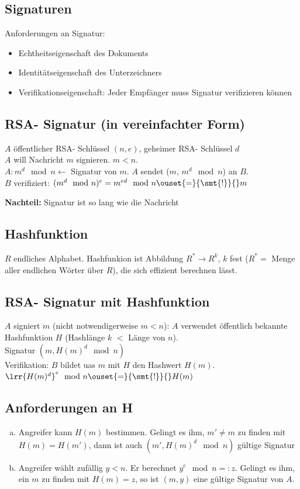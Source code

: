   \subsection{Signaturen}
    Anforderungen an Signatur:
    \begin{itemize}[-]
      \item Echtheitseigenschaft des Dokuments
      \item Identitätseigenschaft des Unterzeichners
      \item Verifikationseigenschaft: Jeder Empfänger muss Signatur
        verifizieren können
    \end{itemize}

  \subsection{RSA- Signatur (in vereinfachter Form)}
    $A$ öffentlicher RSA- Schlüssel $(n,e)$, geheimer RSA- Schlüssel $d$\\
    $A$ will Nachricht $m$ signieren. $m<n$.\\
    $A: m^d\mod n\longleftarrow$ Signatur von $m$. $A$ sendet ($m$, $m^d\mod
    n$) an $B$.\\
    $B$ verifiziert: $(m^d\mod n)^e=m^{ed}\mod n\ouset{=}{\smt{!}}{}m$

    \textbf{Nachteil:} Signatur ist so lang wie die Nachricht

  \subsection{Hashfunktion}
    $R$ endliches Alphabet. Hashfunkion ist Abbildung $R^*\rightarrow R^k$, $k$
    fest ($R^*=$ Menge aller endlichen Wörter über $R$), die sich effizient
    berechnen lässt.

  \subsection{RSA- Signatur mit Hashfunktion}
    $A$ signiert $m$ (nicht notwendigerweise $m<n$): $A$ verwendet öffentlich
    bekannte Hashfunktion $H$ (Hashlänge $k$ $<$ Länge von $n$).\\
    Signatur $(m,H(m)^d\mod n)$\\
    Verifikation: $B$ bildet uas $m$ mit $H$ den Hashwert $H(m)$.
    $\lrr{H(m)^d}^e\mod n\ouset{=}{\smt{!}}{}H(m)$

  \subsection{Anforderungen an H}
    \begin{enumerate}[a)]
      \item Angreifer kann $H(m)$ bestimmen. Gelingt es ihm, $m'\neq m$ zu
        finden mit $H(m)=H(m')$, dann ist auch $(m', H(m)^d\mod n)$ gültige
        Signatur
      \item Angreifer wählt zufällig $y<n$. Er berechnet $y^e\mod n=:z$.
        Gelingt es ihm, ein $m$ zu finden mit $H(m)=z$, so ist $(m, y)$ eine
        gültige Signatur von $A$.\\
    \end{enumerate}

